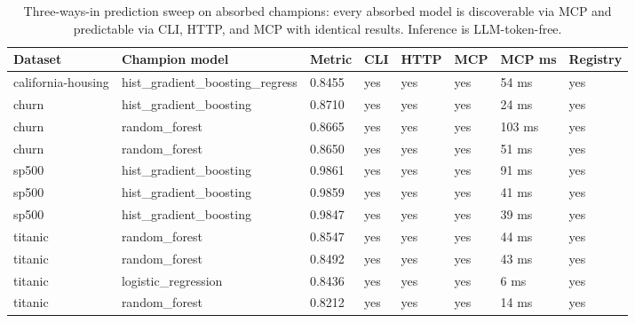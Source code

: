 \begin{table}[H]
\centering\small
\caption{Three-ways-in prediction sweep on absorbed champions: every absorbed model is discoverable via MCP and predictable via CLI, HTTP, and MCP with identical results. Inference is LLM-token-free.}
\label{tab:predictions-prediction-sweep-20260904}
\begin{tabular}{llllllll}
\toprule
Dataset & Champion model & Metric & CLI & HTTP & MCP & MCP ms & Registry \\
\midrule
california-housing & hist\_gradient\_boosting\_regress & 0.8455 & yes & yes & yes & 54 ms & yes \\
churn & hist\_gradient\_boosting & 0.8710 & yes & yes & yes & 24 ms & yes \\
churn & random\_forest & 0.8665 & yes & yes & yes & 103 ms & yes \\
churn & random\_forest & 0.8650 & yes & yes & yes & 51 ms & yes \\
sp500 & hist\_gradient\_boosting & 0.9861 & yes & yes & yes & 91 ms & yes \\
sp500 & hist\_gradient\_boosting & 0.9859 & yes & yes & yes & 41 ms & yes \\
sp500 & hist\_gradient\_boosting & 0.9847 & yes & yes & yes & 39 ms & yes \\
titanic & random\_forest & 0.8547 & yes & yes & yes & 44 ms & yes \\
titanic & random\_forest & 0.8492 & yes & yes & yes & 43 ms & yes \\
titanic & logistic\_regression & 0.8436 & yes & yes & yes & 6 ms & yes \\
titanic & random\_forest & 0.8212 & yes & yes & yes & 14 ms & yes \\
\bottomrule
\end{tabular}
\end{table}
